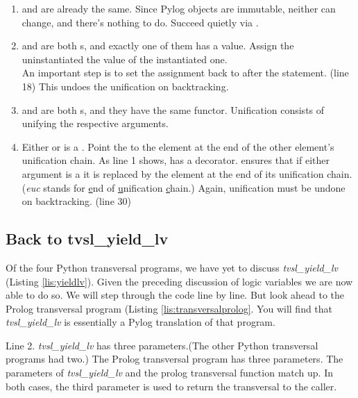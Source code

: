 \begin{enumerate}
    \item {} and  are already the same. Since Pylog objects are immutable, neither can change, and there's nothing to do. Succeed quietly via .

    \item {} and  are both s, and exactly one of them has a value. Assign the uninstantiated  the value of the instantiated one.
    \smallv \\
    An important step is to set the assignment back to  after the  statement. (line 18) This undoes the unification on backtracking.

    \item {} and  are both s, and they have the same functor. Unification consists of unifying the respective arguments. 

    \item Either  or  is a . Point the  to the  element at the end of the other element's unification chain. As line 1 shows,  has a decorator.  ensures that if either argument is a  it is replaced by the element at the end of its unification chain. (\textit{euc} stands for \underline{e}nd of \underline{u}nification \underline{c}hain.) Again, unification must be undone on backtracking. (line 30) 

\end{enumerate} 

\subsection{Back to tvsl\_yield\_lv}
Of the four Python transversal programs, we have yet to discuss \textit{tvsl\_yield\_lv} (Listing \ref{lis:yieldlv}). Given the preceding discussion of logic variables we are now able to do so. We will step through the code line by line. But look ahead to the Prolog transversal program (Listing \ref{lis:transversalprolog}. You will find that \textit{tvsl\_yield\_lv} is essentially a Pylog translation of that program.

Line 2. \textit{tvsl\_yield\_lv} has three parameters.(The other Python transversal programs had two.) The Prolog transversal program has three parameters. The parameters of \textit{tvsl\_yield\_lv} and the prolog transversal function match up. In both cases, the third parameter is used to return the transversal to the caller.

